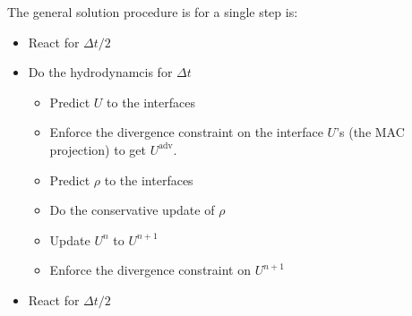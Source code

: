 The general solution procedure is for a single step is:
\begin{itemize}

  \item React for $\Delta t/2$

  \item Do the hydrodynamcis for $\Delta t$

    \begin{itemize}
    \item Predict $U$ to the interfaces 
    \item Enforce the divergence constraint on the interface $U$'s (the
      MAC projection) to get $U^\mathrm{adv}$.
    \item Predict $\rho$ to the interfaces
    \item Do the conservative update of $\rho$
    \item Update $U^n$ to $U^{n+1}$
    \item Enforce the divergence constraint on $U^{n+1}$
    \end{itemize}

  \item React for $\Delta t/2$

\end{itemize}
